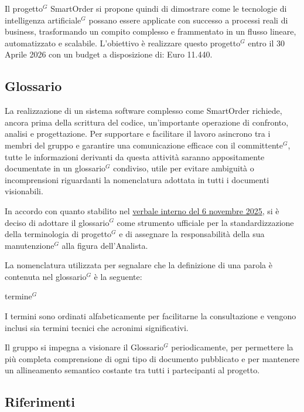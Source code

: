 	Il progetto$^G$ SmartOrder si propone quindi di dimostrare come le tecnologie di intelligenza artificiale$^G$ possano essere applicate con successo a processi reali di business, trasformando un compito complesso e frammentato in un flusso lineare, automatizzato e scalabile. L'obiettivo è realizzare questo progetto$^G$ entro il 30 Aprile 2026 con un budget a disposizione di: Euro 11.440.
	
\subsection{Glossario}
    La realizzazione di un sistema software complesso come SmartOrder richiede, ancora prima della scrittura del codice, un'importante operazione di confronto, analisi e progettazione. Per supportare e facilitare il lavoro asincrono tra i membri del gruppo e garantire una comunicazione efficace con il committente$^G$, tutte le informazioni derivanti da questa attività saranno appositamente documentate in un glossario$^G$ condiviso, utile per evitare ambiguità o incomprensioni riguardanti la nomenclatura adottata in tutti i documenti visionabili.

    In accordo con quanto stabilito nel \href{https://nullpointersgroup.github.io/Documentazione/output/PB/Verbali%20Interni/2025-11-06_verbale_interno.pdf}{verbale interno del 6 novembre 2025}, si è deciso 
	di adottare il glossario$^G$ come strumento ufficiale per la standardizzazione della terminologia di progetto$^G$ e di assegnare la responsabilità della sua manutenzione$^G$ alla figura dell'Analista.

    La nomenclatura utilizzata per segnalare che la definizione di una parola è contenuta nel glossario$^G$ è la seguente: 
    \begin{center}
        termine$^{G}$
    \end{center}

    I termini sono ordinati alfabeticamente per facilitarne la consultazione e vengono inclusi sia termini tecnici che acronimi significativi.

    Il gruppo si impegna a visionare il Glossario$^G$ periodicamente, per permettere la più completa comprensione di ogni tipo di documento pubblicato e per mantenere un allineamento semantico costante tra tutti i partecipanti al progetto. 

    \subsection{Riferimenti}
